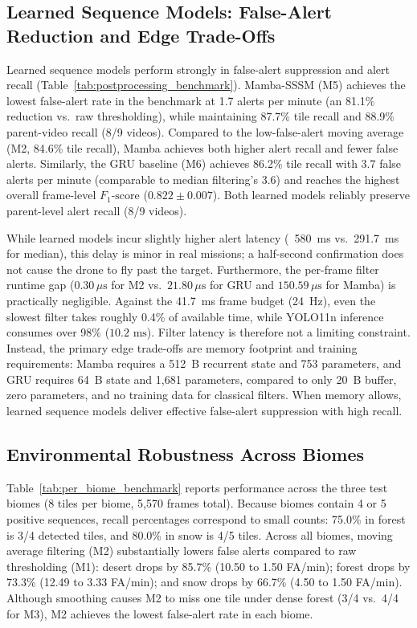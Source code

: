 \documentclass[conference]{IEEEtran}
\begin{document}
\subsection{Learned Sequence Models: False-Alert Reduction and Edge Trade-Offs}
Learned sequence models perform strongly in false-alert suppression and alert recall (Table~\ref{tab:postprocessing_benchmark}). Mamba-SSSM (M5) achieves the lowest false-alert rate in the benchmark at 1.7 alerts per minute (an 81.1\% reduction vs.\ raw thresholding), while maintaining 87.7\% tile recall and 88.9\% parent-video recall (8/9 videos). Compared to the low-false-alert moving average (M2, 84.6\% tile recall), Mamba achieves both higher alert recall and fewer false alerts. Similarly, the GRU baseline (M6) achieves 86.2\% tile recall with 3.7 false alerts per minute (comparable to median filtering's 3.6) and reaches the highest overall frame-level $F_1\text{-score}$ ($0.822 \pm 0.007$). Both learned models reliably preserve parent-level alert recall (8/9 videos).

While learned models incur slightly higher alert latency (~580~ms vs.\ 291.7~ms for median), this delay is minor in real missions; a half-second confirmation does not cause the drone to fly past the target. Furthermore, the per-frame filter runtime gap ($0.30\,\mu\text{s}$ for M2 vs.\ $21.80\,\mu\text{s}$ for GRU and $150.59\,\mu\text{s}$ for Mamba) is practically negligible. Against the 41.7~ms frame budget (24~Hz), even the slowest filter takes roughly 0.4\% of available time, while YOLO11n inference consumes over 98\% ($10.2\text{ ms}$). Filter latency is therefore not a limiting constraint. Instead, the primary edge trade-offs are memory footprint and training requirements: Mamba requires a 512~B recurrent state and 753 parameters, and GRU requires 64~B state and 1,681 parameters, compared to only 20~B buffer, zero parameters, and no training data for classical filters. When memory allows, learned sequence models deliver effective false-alert suppression with high recall.

\subsection{Environmental Robustness Across Biomes}
Table~\ref{tab:per_biome_benchmark} reports performance across the three test biomes (8 tiles per biome, 5,570 frames total). Because biomes contain 4 or 5 positive sequences, recall percentages correspond to small counts: 75.0\% in forest is 3/4 detected tiles, and 80.0\% in snow is 4/5 tiles. Across all biomes, moving average filtering (M2) substantially lowers false alerts compared to raw thresholding (M1): desert drops by 85.7\% (10.50 to 1.50 FA/min); forest drops by 73.3\% (12.49 to 3.33 FA/min); and snow drops by 66.7\% (4.50 to 1.50 FA/min). Although smoothing causes M2 to miss one tile under dense forest (3/4 vs.\ 4/4 for M3), M2 achieves the lowest false-alert rate in each biome.
\end{document}
